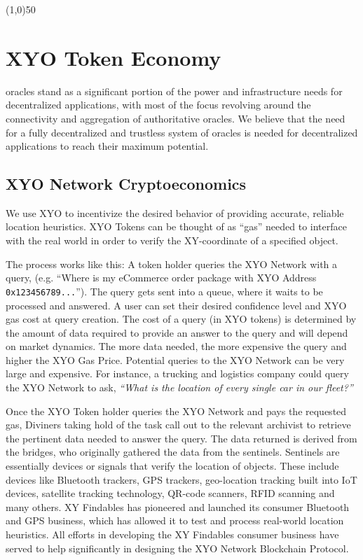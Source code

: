 \documentclass{article}
\begin{document}
\begin{center}
\line(1,0){50}
\end{center}

\section {XYO Token Economy}

\Glspl{oracle} stand as a significant portion of the power and infrastructure needs for decentralized applications, with most of the focus revolving around the connectivity and aggregation of authoritative oracles. We believe that the need for a fully decentralized and trustless system of oracles is needed for decentralized applications to reach their maximum potential.


\subsection {XYO Network Cryptoeconomics}
 We use XYO to incentivize the desired behavior of providing accurate, reliable location \glspl{heuristic}. XYO Tokens can be thought of as ``gas'' needed to interface with the real world in order to verify the XY-coordinate of a specified object.

The process works like this: A token holder queries the XYO Network with a query, (e.g. ``Where is my eCommerce order package with XYO Address \texttt{0x123456789...}''). The query gets sent into a queue, where it waits to be processed and answered. A user can set their desired confidence level and XYO gas cost at query creation. The cost of a query (in XYO tokens) is determined by the amount of data required to provide an answer to the query and will depend on market dynamics.  The more data needed, the more expensive the query and higher the XYO Gas Price. Potential queries to the XYO Network can be very large and expensive. For instance, a trucking and logistics company could query the XYO Network to ask, \textit{``What is the location of every single car in our fleet?''}


Once the XYO Token holder queries the XYO Network and pays the requested gas, Diviners taking hold of the task call out to the relevant \Gls{archivist} to retrieve the pertinent data needed to answer the query. The data returned is derived from the \Glspl{bridge}, who originally gathered the data from the \Glspl{sentinel}. Sentinels are essentially devices or signals that verify the location of objects. These include devices like Bluetooth trackers, GPS trackers, geo-location tracking built into IoT devices, satellite tracking technology, QR-code scanners, RFID scanning and many others. XY Findables has pioneered and launched its consumer Bluetooth and GPS business, which has allowed it to test and process real-world location heuristics. All efforts in developing the XY Findables consumer business have served to help significantly in designing the XYO Network Blockchain Protocol.
\end{document}
